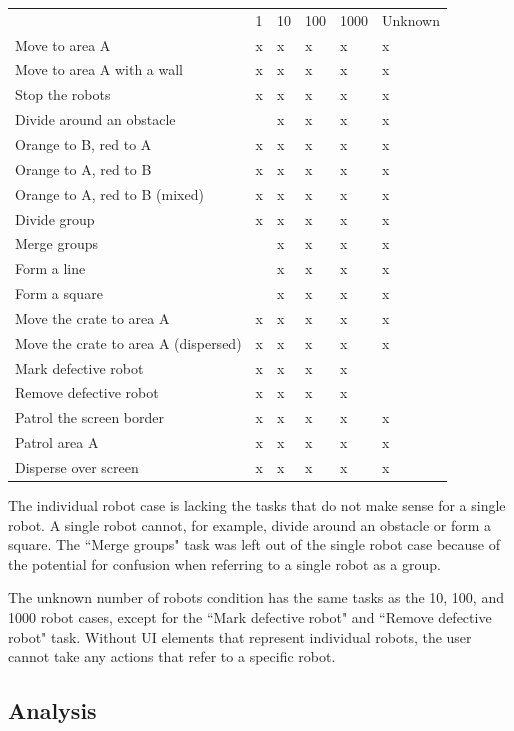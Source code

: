 \begin{tabular}{l|l|l|l|l|l}
& 1 & 10 & 100 & 1000 & Unknown \\
Move to area A & x & x & x & x & x\\
Move to area A with a wall & x & x & x & x & x \\
Stop the robots & x & x & x & x & x\\
Divide around an obstacle & & x & x & x & x \\
Orange to B, red to A & x & x & x & x & x \\
Orange to A, red to B & x & x & x & x & x \\
Orange to A, red to B (mixed) & x & x & x & x & x \\
Divide group & x & x & x & x & x \\
Merge groups & & x & x & x & x \\
Form a line & & x & x & x & x \\
Form a square & & x & x & x & x \\
Move the crate to area A & x & x & x & x & x \\
Move the crate to area A (dispersed) & x & x & x & x & x\\
Mark defective robot & x & x & x & x & \\
Remove defective robot & x & x & x & x &  \\
Patrol the screen border & x & x & x & x & x \\
Patrol area A & x & x & x & x & x \\
Disperse over screen & x & x & x & x & x \\
\end{tabular}

The individual robot case is lacking the tasks that do not make sense for a single robot. A single robot cannot, for example, divide around an obstacle or form a square. 
The ``Merge groups" task was left out of the single robot case because of the potential for confusion when referring to a single robot as a group. 

The unknown number of robots condition has the same tasks as the 10, 100, and 1000 robot cases, except for the ``Mark defective robot" and ``Remove defective robot" task. 
Without UI elements that represent individual robots, the user cannot take any actions that refer to a specific robot. 

\subsection{Analysis}

